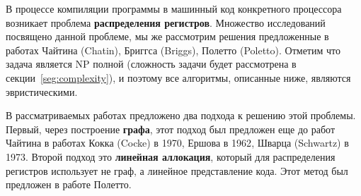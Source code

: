 В процессе компиляции программы в машинный код конкретного процессора возникает проблема \textbf{распределения регистров}. %
Множество исследований посвящено данной проблеме, мы же рассмотрим решения предложенные в
работах Чайтина (Chatin)\cite{chaitin1982}, Бриггса (Briggs)\cite{briggs1994}, Полетто (Poletto)\cite{poletto1999}. %
Отметим что задача является NP полной (сложность задачи будет рассмотрена в секции~\ref{seg:complexity}),
и поэтому все алгоритмы, описанные ниже, являются эвристическими.

В рассматриваемых работах предложено два подхода к решению этой проблемы.
Первый, через построение \textbf{графа}, этот подход был предложен еще до работ Чайтина в работах Кокка
(Cocke) в 1970\cite{cocke1970}, Ершова в 1962\cite{ershov1962}, Шварца (Schwartz) в 1973\cite{schwartz1973}. %
Второй подход это \textbf{линейная аллокация}, который для распределения регистров использует не граф,
а линейное представление кода. Этот метод был предложен в работе Полетто.